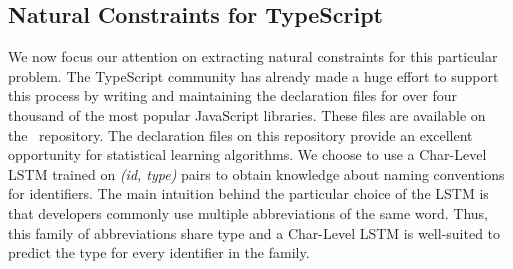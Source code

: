 \documentclass[sigplan,10pt,anonymous]{acmart} %
\theoremstyle{plain}
\theoremstyle{remark}
\theoremstyle{definition}
\begin{document}
\subsection{Natural Constraints for TypeScript}\label{ssec:natprodts}
We now focus our attention on extracting natural constraints for
this particular problem.
The TypeScript community has already
made a huge effort to support this process by writing and maintaining the
declaration files for over four thousand of the most popular JavaScript
libraries. These files are available on the~\citet{definitelytyped}
repository. The declaration files on this repository provide an excellent
opportunity for statistical learning algorithms.
We choose to use a Char-Level LSTM
trained on
\textit{(id, type)} pairs to obtain knowledge about naming conventions
for identifiers.
The main intuition behind the particular choice of the LSTM is that developers commonly use multiple abbreviations of the same word.
Thus, this family of abbreviations share type and a Char-Level LSTM is well-suited to predict the type for every identifier in the family.
\end{document}
